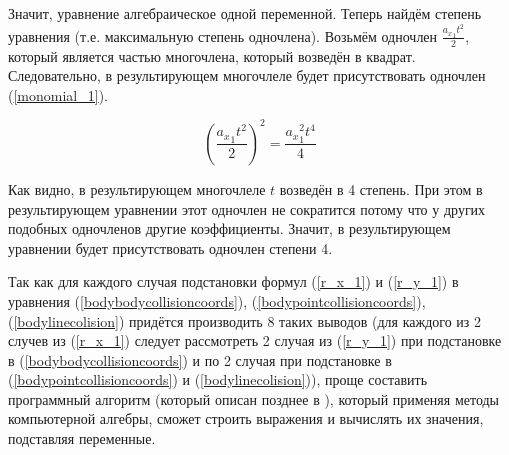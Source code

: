 Значит, уравнение алгебраическое одной переменной.
Теперь найдём степень уравнения (т.е. максимальную степень одночлена).
Возьмём одночлен \(\frac{{a_x}_1 t^2}{2}\), который является частью многочлена, который возведён в квадрат.
Следовательно, в результирующем многочлеле будет присутствовать одночлен (\ref{monomial_1}).

\begin{equation}\label{monomial_1}
  (\frac{{a_x}_1 t^2}{2})^2 = \frac{{a_x}_1^2 t^4}{4}
\end{equation}

Как видно, в результирующем многочлеле \(t\) возведён в 4 степень.
При этом в результирующем уравнении этот одночлен не сократится
потому что у других подобных одночленов другие коэффициенты.
Значит, в результирующем уравнении будет присутствовать одночлен степени 4.

Так как для каждого случая подстановки формул (\ref{r_x_1}) и (\ref{r_y_1}) в уравнения
(\ref{bodybodycollisioncoords}), (\ref{bodypointcollisioncoords}), (\ref{bodylinecolision})
придётся производить 8 таких выводов
(для каждого из 2 случев из (\ref{r_x_1}) следует рассмотреть 2 случая из (\ref{r_y_1}) при подстановке в (\ref{bodybodycollisioncoords})
и по 2 случая при подстановке в (\ref{bodypointcollisioncoords}) и (\ref{bodylinecolision})),
проще составить программный алгоритм (который описан позднее в \TODO),
который применяя методы компьютерной алгебры, сможет строить выражения и вычислять их значения, подставляя переменные.
